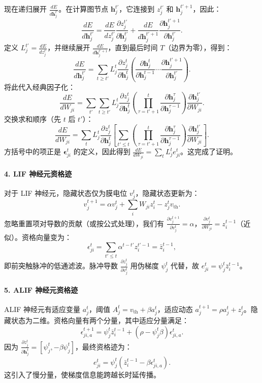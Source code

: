 \documentclass[journal,12pt,onecolumn]{IEEEtran}
\begin{document}
现在递归展开 $\frac{dE}{d\mathbf{h}_j^{t'}}$。在计算图节点 $\mathbf{h}_j^{t'}$，它连接到 $z_j^{t'}$ 和 $\mathbf{h}_j^{t'+1}$，因此：
\[
\frac{dE}{d\mathbf{h}_j^{t'}} = \frac{dE}{dz_j^{t'}} \frac{\partial z_j^{t'}}{\partial \mathbf{h}_j^{t'}} + \frac{dE}{d\mathbf{h}_j^{t'+1}} \frac{\partial \mathbf{h}_j^{t'+1}}{\partial \mathbf{h}_j^{t'}}.
\]
定义 $L_j^{t'} = \frac{dE}{dz_j^{t'}}$，并继续展开 $\frac{dE}{d\mathbf{h}_j^{t'+1}}$，直到最后时间 $T$（边界为零），得到：
\[
\frac{dE}{d\mathbf{h}_j^{t'}} = \sum_{t\ge t'} L_j^t \frac{\partial z_j^t}{\partial \mathbf{h}_j^t} \left( \frac{\partial \mathbf{h}_j^t}{\partial \mathbf{h}_j^{t-1}} \cdots \frac{\partial \mathbf{h}_j^{t'+1}}{\partial \mathbf{h}_j^{t'}} \right).
\]
将此代入经典因子化：
\[
\frac{dE}{dW_{ji}} = \sum_{t'} \sum_{t\ge t'} L_j^t \frac{\partial z_j^t}{\partial \mathbf{h}_j^t} \left( \prod_{\tau=t'+1}^{t} \frac{\partial \mathbf{h}_j^{\tau}}{\partial \mathbf{h}_j^{\tau-1}} \right) \frac{\partial \mathbf{h}_j^{t'}}{\partial W_{ji}}.
\]
交换求和顺序（先 $t$ 后 $t'$）：
\[
\frac{dE}{dW_{ji}} = \sum_t L_j^t \frac{\partial z_j^t}{\partial \mathbf{h}_j^t} \left[ \sum_{t'\le t} \left( \prod_{\tau=t'+1}^{t} \frac{\partial \mathbf{h}_j^{\tau}}{\partial \mathbf{h}_j^{\tau-1}} \right) \frac{\partial \mathbf{h}_j^{t'}}{\partial W_{ji}} \right].
\]
方括号中的项正是 $\boldsymbol{\epsilon}_{ji}^t$ 的定义，因此得到 $\frac{dE}{dW_{ji}} = \sum_t L_j^t e_{ji}^t$。这完成了证明。

\paragraph{4. LIF 神经元资格迹}
对于 LIF 神经元，隐藏状态仅为膜电位 $v_j^t$，隐藏状态更新为：
\[
v_j^{t+1} = \alpha v_j^t + \sum_i W_{ji} z_i^t - z_j^t v_{\text{th}}.
\]
忽略重置项对导数的贡献（或按公式处理），我们有 $\frac{\partial v_j^{t+1}}{\partial v_j^t} = \alpha$，$\frac{\partial v_j^t}{\partial W_{ji}} = z_i^{t-1}$（近似）。资格向量变为：
\[
\epsilon_{ji}^t = \sum_{t'\le t} \alpha^{t-t'} z_i^{t'-1} = \bar{z}_i^{t-1},
\]
即前突触脉冲的低通滤波。脉冲导数 $\frac{\partial z_j^t}{\partial v_j^t}$ 用伪梯度 $\psi_j^t$ 代替，故 $e_{ji}^t = \psi_j^t \bar{z}_i^{t-1}$。

\paragraph{5. ALIF 神经元资格迹}
ALIF 神经元有适应变量 $a_j^t$，阈值 $A_j^t = v_{\text{th}} + \beta a_j^t$，适应动态 $a_j^{t+1} = \rho a_j^t + z_j^t$。隐藏状态为二维。资格向量有两个分量，其中适应分量满足：
\[
\epsilon_{ji,a}^{t+1} = \psi_j^t \bar{z}_i^{t-1} + (\rho - \psi_j^t \beta) \epsilon_{ji,a}^t.
\]
因为 $\frac{\partial z_j^t}{\partial \mathbf{h}_j^t} = [\psi_j^t, -\beta \psi_j^t]$，最终资格迹为：
\[
e_{ji}^t = \psi_j^t \left( \bar{z}_i^{t-1} - \beta \epsilon_{ji,a}^t \right).
\]
这引入了慢分量，使梯度信息能跨越长时延传播。
\end{document}
